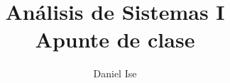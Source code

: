 \documentclass{article}
\title{Análisis de Sistemas I\\Apunte de clase}
\author{Daniel Ise}
\date{}
\begin{document}
\maketitle

\tableofcontents

\section{}
\end{document}
